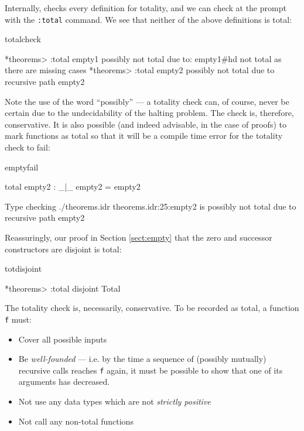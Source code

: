 \noindent
Internally, \Idris{} checks every definition for totality, and we can check at
the prompt with the \texttt{:total} command. We see that neither of the above
definitions is total:

\begin{SaveVerbatim}{totalcheck}

*theorems> :total empty1
possibly not total due to: empty1#hd
	not total as there are missing cases
*theorems> :total empty2
possibly not total due to recursive path empty2

\end{SaveVerbatim}

\noindent
Note the use of the word ``possibly'' --- a totality check can, of course,
never be certain due to the undecidability of the halting problem. The check
is, therefore, conservative.  It is also possible (and indeed advisable, in the
case of proofs) to mark functions as total so that it will be a compile time
error for the totality check to fail:

\begin{SaveVerbatim}{emptyfail}

total empty2 : _|_
empty2 = empty2

Type checking ./theorems.idr
theorems.idr:25:empty2 is possibly not total due to recursive path empty2 

\end{SaveVerbatim}

\noindent
Reassuringly, our proof in Section \ref{sect:empty} that the zero and successor constructors
are disjoint is total:

\begin{SaveVerbatim}{totdisjoint}

*theorems> :total disjoint
Total

\end{SaveVerbatim}

\noindent
The totality check is, necessarily, conservative. To be recorded as total, a
function \texttt{f} must:

\begin{itemize}
\item Cover all possible inputs
\item Be \emph{well-founded} --- i.e. by the time a sequence of 
(possibly mutually) recursive calls reaches \texttt{f} again, it must
be possible to show that one of its arguments has decreased.
\item Not use any data types which are not \emph{strictly positive}
\item Not call any non-total functions
\end{itemize}


